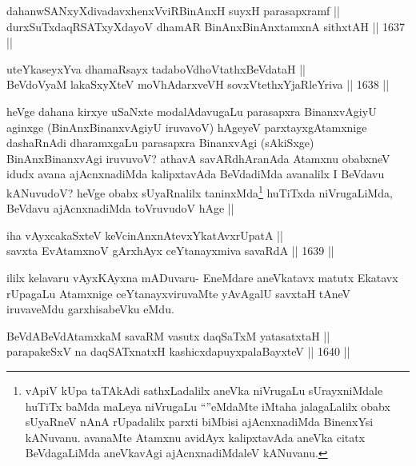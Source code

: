 \begin{shl}
dahanwSANxyXdivadavxhenxVviRBinAnxH suyxH parasapxramf || \\
durxSuTxdaqRSATxyXdayoV dhamAR BinAnxBinAnxtamxnA sithxtAH ||  1637 ||  
\end{shl}

\begin{shl}
uteYkaseyxYva dhamaRsayx tadaboVdhoVtathxBeVdataH || \\
BeVdoV\s yaM lakaSxyXteV moVhAdarxveVH sovxVtethxYjaRleYriva ||  1638 ||  
\end{shl}

\begin{artha}
heVge dahana kirxye uSaNxte modalAdavugaLu parasapxra BinanxvAgiyU aginxge (BinAnxBinanxvAgiyU iruvavoV) hAgeyeV parxtayxgAtamxnige dashaRnAdi dharamxgaLu parasapxra BinanxvAgi (sAkiSxge) BinAnxBinanxvAgi iruvuvoV? athavA savARdhAranAda Atamxnu obabxneV idudx avana ajAcnxnadiMda kalipxtavAda BeVdadiMda avanalilx I BeVdavu kANuvudoV? heVge obabx sUyaRnalilx taninxMda\footnote{vApiV kUpa taTAkAdi sathxLadalilx aneVka niVrugaLu sUrayxniMdale huTiTx baMda maLeya niVrugaLu ``\stext''eMdaMte iMtaha jalagaLalilx obabx sUyaRneV nAnA rUpadalilx parxti biMbisi ajAcnxnadiMda BinenxYsi kANuvanu. avanaMte Atamxnu avidAyx kalipxtavAda aneVka citatx BeVdagaLiMda aneVkavAgi ajAcnxnadiMdaleV kANuvanu.} huTiTxda niVrugaLiMda, BeVdavu ajAcnxnadiMda toVruvudoV hAge ||
\end{artha}


\begin{shl}
iha vAyxcakaSxteV keVcinAnxnAtevxYkatAvxrUpatA || \\
savxta EvA\s \s tamxnoV gArxhAyx ceYtanayxmiva savaRdA ||  1639 ||  
\end{shl}

\begin{artha}
ililx kelavaru vAyxKAyxna mADuvaru- EneMdare aneVkatavx matutx Ekatavx rUpagaLu Atamxnige ceYtanayxviruvaMte yAvAgalU savxtaH tAneV iruvaveMdu garxhisabeVku eMdu.
\end{artha}


\begin{shl}
BeVdABeVdAtamxkaM savaRM vasutx daqSaTxM yatasatxtaH ||  \\
parapakeSxV na daqSATxnatxH kashicxdapuyxpalaBayxteV ||  1640 ||  
\end{shl}

